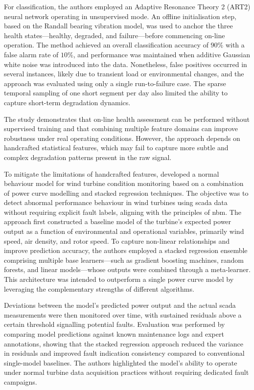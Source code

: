 For classification, the authors employed an Adaptive Resonance Theory 2 (ART2) neural network operating in unsupervised mode.
An offline initialisation step, based on the Randall bearing vibration model, was used to anchor the three health states—healthy, degraded, and failure—before commencing on-line operation.
The method achieved an overall classification accuracy of $90\%$ with a false alarm rate of $10\%$, and performance was maintained when additive Gaussian white noise was introduced into the data.
Nonetheless, false positives occurred in several instances, likely due to transient load or environmental changes, and the approach was evaluated using only a single run-to-failure case.
The sparse temporal sampling of one short segment per day also limited the ability to capture short-term degradation dynamics.

The study demonstrates that on-line health assessment can be performed without supervised training and that combining multiple feature domains can improve robustness under real operating conditions.
However, the approach depends on handcrafted statistical features, which may fail to capture more subtle and complex degradation patterns present in the raw signal.

To mitigate the limitations of handcrafted features, \cite{bilendo_normal_2022} developed a normal behaviour model for wind turbine condition monitoring based on a combination of power curve modelling and stacked regression techniques.
The objective was to detect abnormal performance behaviour in wind turbines using \gls{scada} data without requiring explicit fault labels, aligning with the principles of \gls{nbm}.
The approach first constructed a baseline model of the turbine's expected power output as a function of environmental and operational variables, primarily wind speed, air density, and rotor speed.
To capture non-linear relationships and improve prediction accuracy, the authors employed a stacked regression ensemble comprising multiple base learners—such as gradient boosting machines, random forests, and linear models—whose outputs were combined through a meta-learner.
This architecture was intended to outperform a single power curve model by leveraging the complementary strengths of different algorithms.

Deviations between the model's predicted power output and the actual \gls{scada} measurements were then monitored over time, with sustained residuals above a certain threshold signalling potential faults.
Evaluation was performed by comparing model predictions against known maintenance logs and expert annotations, showing that the stacked regression approach reduced the variance in residuals and improved fault indication consistency compared to conventional single-model baselines.
The authors highlighted the model's ability to operate under normal turbine data acquisition practices without requiring dedicated fault campaigns.

